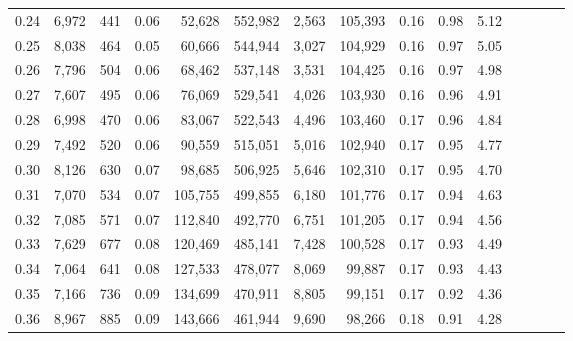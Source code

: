 \begin{tabular}{rrrcrrrrrrrrrrr}
0.24 &   6,972 &    441 &                                       0.06 &   52,628 &  552,982 &    2,563 &  105,393 &  0.16 &  0.98 &                         5.12 \\
0.25 &   8,038 &    464 &                                       0.05 &   60,666 &  544,944 &    3,027 &  104,929 &  0.16 &  0.97 &                         5.05 \\
0.26 &   7,796 &    504 &                                       0.06 &   68,462 &  537,148 &    3,531 &  104,425 &  0.16 &  0.97 &                         4.98 \\
0.27 &   7,607 &    495 &                                       0.06 &   76,069 &  529,541 &    4,026 &  103,930 &  0.16 &  0.96 &                         4.91 \\
0.28 &   6,998 &    470 &                                       0.06 &   83,067 &  522,543 &    4,496 &  103,460 &  0.17 &  0.96 &                         4.84 \\
0.29 &   7,492 &    520 &                                       0.06 &   90,559 &  515,051 &    5,016 &  102,940 &  0.17 &  0.95 &                         4.77 \\
0.30 &   8,126 &    630 &                                       0.07 &   98,685 &  506,925 &    5,646 &  102,310 &  0.17 &  0.95 &                         4.70 \\
0.31 &   7,070 &    534 &                                       0.07 &  105,755 &  499,855 &    6,180 &  101,776 &  0.17 &  0.94 &                         4.63 \\
0.32 &   7,085 &    571 &                                       0.07 &  112,840 &  492,770 &    6,751 &  101,205 &  0.17 &  0.94 &                         4.56 \\
0.33 &   7,629 &    677 &                                       0.08 &  120,469 &  485,141 &    7,428 &  100,528 &  0.17 &  0.93 &                         4.49 \\
0.34 &   7,064 &    641 &                                       0.08 &  127,533 &  478,077 &    8,069 &   99,887 &  0.17 &  0.93 &                         4.43 \\
0.35 &   7,166 &    736 &                                       0.09 &  134,699 &  470,911 &    8,805 &   99,151 &  0.17 &  0.92 &                         4.36 \\
0.36 &   8,967 &    885 &                                       0.09 &  143,666 &  461,944 &    9,690 &   98,266 &  0.18 &  0.91 &                         4.28 \\

\end{tabular}
